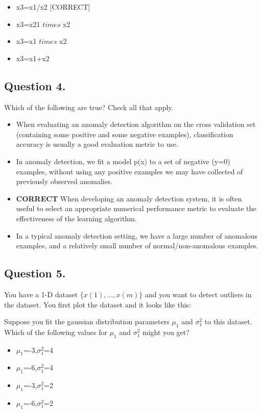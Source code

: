 \documentclass[11pt]{article} %
\begin{document}
\begin{itemize}
	\item x3=x1/x2 [CORRECT]
	
	\item x3=x21 $times$ x2
	
	\item x3=x1 $times$ x2
	
	\item  x3=x1+x2
	
\end{itemize}

\subsection*{Question 4. }
Which of the following are true? Check all that apply.

\begin{itemize}
	\item When evaluating an anomaly detection algorithm on the cross validation set (containing some positive and some negative examples), classification accuracy is usually a good evaluation metric to use.
	\item  In anomaly detection, we fit a model p(x) to a set of negative (y=0) examples, without using any positive examples we may have collected of previously observed anomalies.
	\item \textbf{CORRECT} When developing an anomaly detection system, it is often useful to select an appropriate numerical performance metric to evaluate the effectiveness of the learning algorithm.
	\item In a typical anomaly detection setting, we have a large number of anomalous examples, and a relatively small number of normal/non-anomalous examples.
\end{itemize}
\subsection*{Question 5. }
You have a 1-D dataset $\{x(1),\ldots,x(m)\}$ and you want to detect outliers in the dataset. You first plot the dataset and it looks like this:


Suppose you fit the gaussian distribution parameters $\mu_1$ and $\sigma^2_1$ to this dataset. Which of the following values for $\mu_1$ and $\sigma^2_1$ might you get?
\begin{itemize}
	\item $\mu_1$=-3,$\sigma^2_1$=4
	\item 
	$\mu_1$=-6,$\sigma^2_1$=4
	\item
	$\mu_1$=-3,$\sigma^2_1$=2
	\item 
	$\mu_1$=-6,$\sigma^2_1$=2
\end{itemize}
\end{document}
